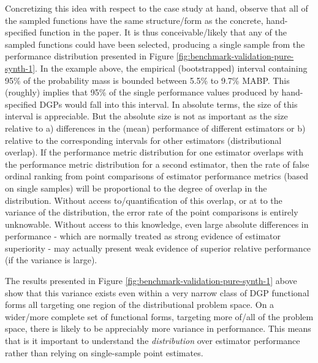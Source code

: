 \documentclass[../main.tex]{subfiles}
\begin{document}
Concretizing this idea with respect to the case study at hand, observe that all of the sampled functions have the same structure/form as the concrete, hand-specified function in the paper. It is thus conceivable/likely that any of the sampled functions could have been selected, producing a single sample from the performance distribution presented in Figure \ref{fig:benchmark-validation-pure-synth-1}. In the example above, the empirical (bootstrapped) interval containing 95\% of the probability mass is bounded between 5.5\% to 9.7\% MABP. This (roughly) implies that 95\% of the single performance values produced by hand-specified DGPs would fall into this interval. In absolute terms, the size of this interval is appreciable. But the absolute size is not as important as the size relative to a) differences in the (mean) performance of different estimators or b) relative to the corresponding intervals for other estimators (distributional overlap). If the performance metric distribution for one estimator overlaps with the performance metric distribution for a second estimator, then the rate of false ordinal ranking from point comparisons of estimator performance metrics (based on single samples) will be proportional to the degree of overlap in the distribution. Without access to/quantification of this overlap, or at to the variance of the distribution, the error rate of the point comparisons is entirely unknowable. Without access to this knowledge, even large absolute differences in performance - which are normally treated as strong evidence of estimator superiority - may actually present weak evidence of superior relative performance (if the variance is large).

\vspace{\baselineskip}

The results presented in Figure \ref{fig:benchmark-validation-pure-synth-1} above show that this variance exists even within a very narrow class of DGP functional forms all targeting one region of the distributional problem space. On a wider/more complete set of functional forms, targeting more of/all of the problem space, there is likely to be appreciably more variance in performance. This means that is it important to understand the \textit{distribution} over estimator performance rather than relying on single-sample point estimates.
\end{document}
